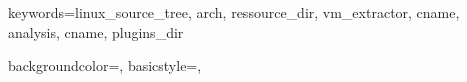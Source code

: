 {
  keywords={linux_source_tree, arch, ressource_dir, vm_extractor, cname, analysis, cname, plugins_dir}
}

{
    backgroundcolor=\color{black},
    basicstyle={\color{white},\ttfamily}
}

\usepackage{xcolor}

\usepackage{xr}

\usepackage{chngcntr}

\usepackage{ifthen}

\usepackage{xspace}

\usepackage{fancyhdr}

\usepackage{titlesec}

\usepackage[toc, automake, nonumberlist]{glossaries}

\usepackage[figure,table,lstlisting]{totalcount}

\usepackage{pdfpages} %